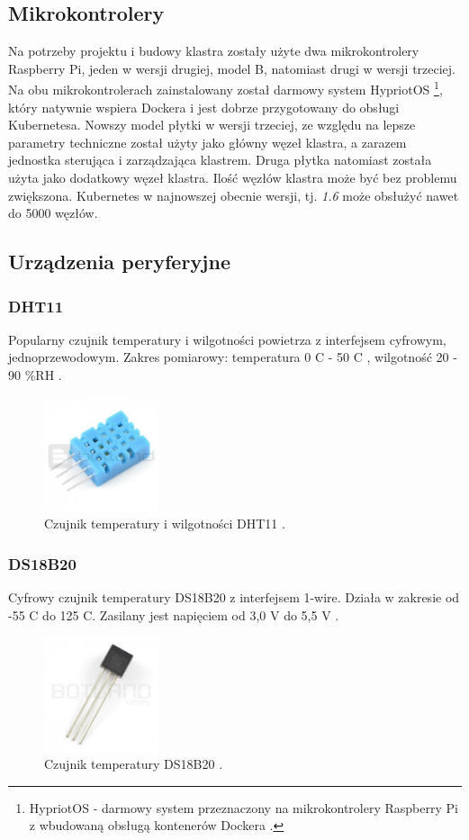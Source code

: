 \documentclass[12pt]{report}
\let\Oldsubsection\subsection
\renewcommand{\subsection}{\FloatBarrier\Oldsubsection}
\let\Oldsubsubsection\subsubsection
\renewcommand{\subsubsection}{\FloatBarrier\Oldsubsubsection}
\begin{document}
{\subsection{Mikrokontrolery}
Na potrzeby projektu i budowy klastra zostały użyte dwa mikrokontrolery Raspberry Pi, jeden w wersji drugiej, model B, natomiast drugi w wersji trzeciej. Na obu mikrokontrolerach zainstalowany został darmowy system HypriotOS \footnote{HypriotOS - darmowy system przeznaczony na mikrokontrolery Raspberry Pi z wbudowaną obsługą kontenerów Dockera \cite{hypriotos}.}, który natywnie wspiera Dockera i jest dobrze przygotowany do obsługi Kubernetesa. Nowszy model płytki w wersji trzeciej, ze względu na lepsze parametry techniczne został użyty jako główny węzeł klastra, a zarazem jednostka sterująca i zarządzająca klastrem. Druga płytka natomiast została użyta jako dodatkowy węzeł klastra. Ilość węzłów klastra może być bez problemu zwiększona. Kubernetes w najnowszej obecnie wersji, tj. \textit{1.6} może obsłużyć nawet do 5000 węzłów. 
\subsection{Urządzenia peryferyjne}
\subsubsection{DHT11}
Popularny czujnik temperatury i wilgotności powietrza z interfejsem cyfrowym, jednoprzewodowym. Zakres pomiarowy: temperatura 0 \textdegree{}C - 50 \textdegree{}C , wilgotność 20 - 90 \%RH \cite{dht11Botland}. %
\begin{figure}[h]
	\centering
	\includegraphics[width=0.3\textwidth]{images/dht11.jpg}
	\caption{Czujnik temperatury i wilgotności DHT11 \cite{dht11Img}.}
\end{figure}
\subsubsection{DS18B20}
Cyfrowy czujnik temperatury DS18B20 z interfejsem 1-wire. Działa w zakresie od -55 \textdegree{}C do 125 \textdegree{}C. Zasilany jest napięciem od 3,0 V do 5,5 V \cite{ds18b20Botland}. %
\begin{figure}[h]
	\centering
	\includegraphics[width=0.3\textwidth]{images/ds18b20.jpg}
	\caption{Czujnik temperatury DS18B20 \cite{ds18b20Img}.}
\end{figure}
}
\end{document}
